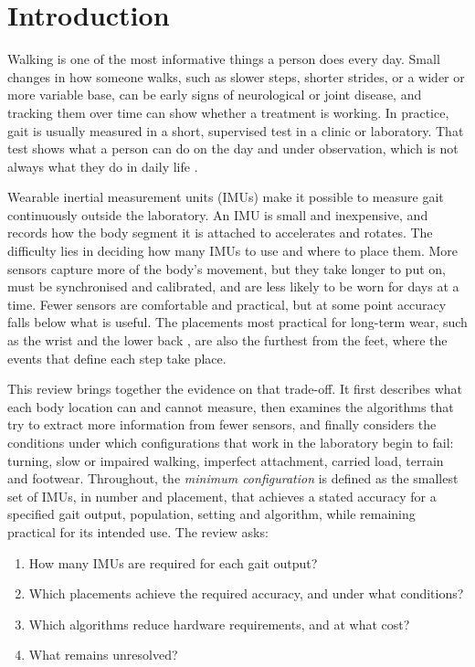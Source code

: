\documentclass[10pt,a4paper,twocolumn]{article}
\begin{document}
\section{Introduction}
\label{sec:intro}

Walking is one of the most informative things a person does every day. Small changes in how someone walks, such as slower steps, shorter strides, or a wider or more variable base, can be early signs of neurological or joint disease, and tracking them over time can show whether a treatment is working. In practice, gait is usually measured in a short, supervised test in a clinic or laboratory. That test shows what a person can do on the day and under observation, which is not always what they do in daily life \citep{carcreff2020}.

Wearable inertial measurement units (IMUs) make it possible to measure gait continuously outside the laboratory. An IMU is small and inexpensive, and records how the body segment it is attached to accelerates and rotates. The difficulty lies in deciding how many IMUs to use and where to place them. More sensors capture more of the body's movement, but they take longer to put on, must be synchronised and calibrated, and are less likely to be worn for days at a time. Fewer sensors are comfortable and practical, but at some point accuracy falls below what is useful. The placements most practical for long-term wear, such as the wrist and the lower back \citep{brand2022,kluge2024,rantalainen2020}, are also the furthest from the feet, where the events that define each step take place.

This review brings together the evidence on that trade-off. It first describes what each body location can and cannot measure, then examines the algorithms that try to extract more information from fewer sensors, and finally considers the conditions under which configurations that work in the laboratory begin to fail: turning, slow or impaired walking, imperfect attachment, carried load, terrain and footwear. Throughout, the \emph{minimum configuration} is defined as the smallest set of IMUs, in number and placement, that achieves a stated accuracy for a specified gait output, population, setting and algorithm, while remaining practical for its intended use. The review asks:

\begin{enumerate}[label=\textbf{Q\arabic*.}]
  \item How many IMUs are required for each gait output?
  \item Which placements achieve the required accuracy, and under what conditions?
  \item Which algorithms reduce hardware requirements, and at what cost?
  \item What remains unresolved?
\end{enumerate}
\end{document}
